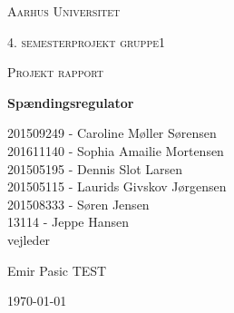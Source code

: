 \thispagestyle{empty}
	{\centering
	{\scshape\LARGE Aarhus Universitet \par}
	\vspace{1cm}
	{\scshape\Large 4. semesterprojekt gruppe1\par}
	{\scshape\Large Projekt rapport\par}
	\vspace{1.5cm}
	{\huge\bfseries Spændingsregulator\par}
	\vspace{2cm}
	{\Large
	201509249 - Caroline Møller Sørensen\\
	201611140 - Sophia Amailie Mortensen\\
	201505195 - Dennis Slot Larsen \\
	201505115 - Laurids Givskov Jørgensen\\
	201508333 - Søren Jensen\\
	13114 - Jeppe Hansen\\   }
	\vfill
	vejleder\par
	Emir Pasic TEST

	\vfill

	{\large \today\par}
\par}

